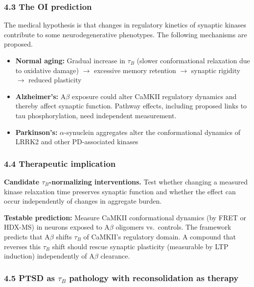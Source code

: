 \documentclass[
]{article}
\providecommand{\tightlist}{%
  \setlength{\itemsep}{0pt}\setlength{\parskip}{0pt}}
\begin{document}
\hypertarget{the-oi-prediction}{%
\subsubsection{4.3 The OI prediction}\label{the-oi-prediction}}

The medical hypothesis is that changes in regulatory kinetics of
synaptic kinases contribute to some neurodegenerative phenotypes. The
following mechanisms are proposed.

\begin{itemize}
\tightlist
\item
  \textbf{Normal aging:} Gradual increase in \(\tau_B\) (slower
  conformational relaxation due to oxidative damage) \(\to\) excessive
  memory retention \(\to\) synaptic rigidity \(\to\) reduced plasticity
\item
  \textbf{Alzheimer's:} A\(\beta\) exposure could alter CaMKII
  regulatory dynamics and thereby affect synaptic function. Pathway
  effects, including proposed links to tau phosphorylation, need
  independent measurement.
\item
  \textbf{Parkinson's:} \(\alpha\)-synuclein aggregates alter the
  conformational dynamics of LRRK2 and other PD-associated kinases
\end{itemize}

\hypertarget{therapeutic-implication}{%
\subsubsection{4.4 Therapeutic
implication}\label{therapeutic-implication}}

\textbf{Candidate \(\tau_B\)-normalizing interventions.} Test whether
changing a measured kinase relaxation time preserves synaptic function
and whether the effect can occur independently of changes in aggregate
burden.

\textbf{Testable prediction:} Measure CaMKII conformational dynamics (by
FRET or HDX-MS) in neurons exposed to A\(\beta\) oligomers vs.~controls.
The framework predicts that A\(\beta\) shifts \(\tau_B\) of CaMKII's
regulatory domain. A compound that reverses this \(\tau_B\) shift should
rescue synaptic plasticity (measurable by LTP induction) independently
of A\(\beta\) clearance.

\hypertarget{ptsd-as-tau_b-pathology-with-reconsolidation-as-therapy}{%
\subsubsection{\texorpdfstring{4.5 PTSD as \(\tau_B\) pathology with
reconsolidation as
therapy}{4.5 PTSD as \textbackslash tau\_B pathology with reconsolidation as therapy}}\label{ptsd-as-tau_b-pathology-with-reconsolidation-as-therapy}}
\end{document}

